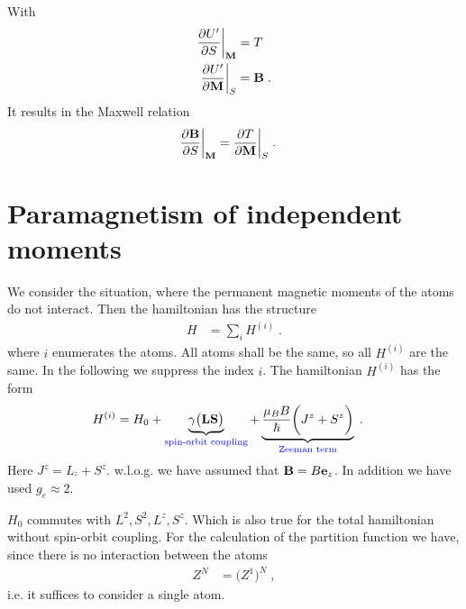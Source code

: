 With
%
\begin{align*}
\frac{\partial U'}{\partial S}\bigg|_{\mathbf M}&= T\\
\frac{\partial U'}{\partial \mathbf M}\bigg|_{S}&= \mathbf B\;.
\end{align*}
%
It results in the Maxwell relation
%
\begin{align*}
\frac{\partial \mathbf B}{\partial S}\bigg|_{\mathbf M}&=\frac{\partial T}{\partial \mathbf M}\bigg|_{S}\;.
\end{align*}
%
\section{Paramagnetism of independent moments}

We consider the situation, where the permanent magnetic moments of the atoms do not interact.
Then the hamiltonian has the structure
%
\begin{align*}
H &= \sum_{i} H^{(i)}\;.
\end{align*}
%
where $i$ enumerates the atoms. All atoms shall be the same, so all $H^{(i)}$ are the same.
In the following we suppress the index $i$. The hamiltonian $H^{(i)}$ has the form
%
\begin{align}\label{eq:H:spin:orbit:a}
H^{(i)} &= H_{0} + \underbrace{
\gamma\big( \mathbf L\mathbf S \big)
}_{\color{blue}  \text{spin-orbit coupling}}
+\underbrace{
\frac{\mu_{B} B}{\hbar} \bigg( J^{z} + S^{z}\bigg)
}_{\color{blue} \text{Zeeman term} }\;.
\end{align}
%
Here  $J^{z} = L_{^{z}} + S^{z}$.
w.l.o.g. we have assumed that $\mathbf B = B \mathbf e_{z}$. In addition we have used $g_{e}\approx 2$.

$H_{0}$ commutes with $L^{2},S^{2},L^{z},S^{z}$. Which is also true for the total hamiltonian without spin-orbit coupling. For the calculation of the partition function we have, since there is no interaction between the atoms
%
\begin{align*}
Z^{N} &= \big(Z^{1}\big)^{N}\;,
\end{align*}
%
i.e. it suffices to consider a single atom.
